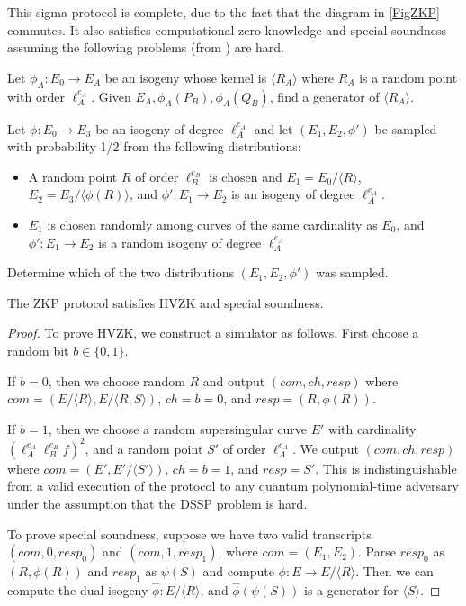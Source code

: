 \documentclass[runningheads,a4paper]{llncs}
\begin{document}
This sigma protocol is complete, due to the fact that the diagram in \ref{FigZKP} commutes. It also satisfies computational zero-knowledge and special soundness assuming the following problems (from \cite{FJP14}) are hard.

\begin{problem}
Let $\phi_A:E_0 \to E_A$ be an isogeny whose kernel is $\langle R_A \rangle$ where $R_A$ is a random point with order $\ell_A^{e_A}$. Given $E_A, \phi_A(P_B), \phi_A(Q_B)$, find a generator of $\langle R_A \rangle$.
\end{problem}

\begin{problem}
Let $\phi:E_0 \to E_3$ be an isogeny of degree $\ell_A^{e_A}$ and let $(E_1,E_2,\phi')$ be sampled with probability 1/2 from the following distributions:
\begin{itemize}
	\item 
	A random point $R$ of order $\ell_B^{e_B}$ is chosen and $E_1 = E_0/\langle R \rangle$, $E_2 = E_3/\langle \phi(R) \rangle$, and $\phi':E_1 \to E_2$ is an isogeny of degree $\ell_A^{e_A}$.

	\item
	$E_1$ is chosen randomly among curves of the same cardinality as $E_0$, and $\phi':E_1 \to E_2$ is a random isogeny of degree $\ell_A^{e_A}$
\end{itemize}
Determine which of the two distributions $(E_1,E_2,\phi')$ was sampled.
\end{problem}

\begin{theorem} 
The ZKP protocol satisfies HVZK and special soundness.
\end{theorem}
\begin{proof}
To prove HVZK, we construct a simulator as follows. First choose a random bit $b \in \{0,1\}$. 

If $b=0$, then we choose random $R$ and output $(com,ch,resp)$ where $com = (E/\langle R\rangle, E/\langle R,S\rangle)$, $ch = b = 0$, and $resp = (R,\phi(R))$.

If $b=1$, then we choose a random supersingular curve $E'$ with cardinality $(\ell_A^{e_A}\ell_B^{e_B}f)^2$, and a random point $S'$ of order $\ell_A^{e_A}$. We output $(com,ch,resp)$ where $com = (E', E'/\langle S' \rangle)$, $ch=b=1$, and $resp = S'$. This is indistinguishable from a valid execution of the protocol to any quantum polynomial-time adversary under the assumption that the DSSP problem is hard.

To prove special soundness, suppose we have two valid transcripts $(com,0,resp_0)$ and $(com,1,resp_1)$, where $com = (E_1,E_2)$. Parse $resp_0$ as $(R,\phi(R))$ and $resp_1$ as $\psi(S)$ and compute $\phi:E \to E/\langle R \rangle$. Then we can compute the dual isogeny $\hat \phi:E/\langle R \rangle$, and $\hat\phi(\psi(S))$ is a generator for $\langle S \rangle$.
\end{proof}
\end{document}
